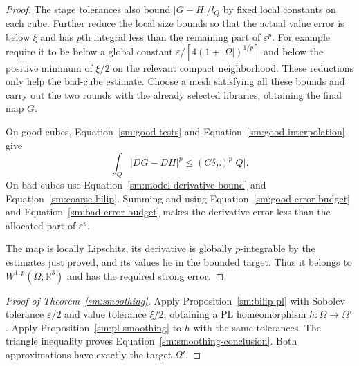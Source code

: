 \documentclass[11pt]{article}
\numberwithin{equation}{section}
\theoremstyle{definition}
\theoremstyle{remark}
\begin{document}
\begin{proof}
The stage tolerances also bound
$|G-H|/l_Q$ by fixed local constants
on each cube.  Further reduce the
local size bounds so that the actual
value error is below $\xi$ and has
$p$th integral less than the remaining
part of $\varepsilon^p$.  For example require
it to be below a global constant
$\varepsilon/[4(1+|\Omega|)^{1/p}]$ and below
the positive minimum of $\xi/2$ on
the relevant compact neighborhood.
These reductions only help the bad-cube
estimate.  Choose a mesh satisfying all these bounds and carry
out the two rounds with the already selected libraries, obtaining
the final map $G$.

On good cubes, Equation~\eqref{sm:good-tests} and
Equation~\eqref{sm:good-interpolation} give
\[
 \int_Q|DG-DH|^p\le(C\delta_P)^p|Q|.
\]
On bad cubes use
Equation~\eqref{sm:model-derivative-bound} and
Equation~\eqref{sm:coarse-bilip}.  Summing and
using Equation~\eqref{sm:good-error-budget} and
Equation~\eqref{sm:bad-error-budget} makes the
derivative error less than the allocated
part of $\varepsilon^p$.

The map is locally Lipschitz,
its derivative is globally $p$-integrable
by the estimates just proved, and its
values lie in the bounded target.
Thus it belongs to $W^{1,p}(\Omega;\mathbb R^3)$
and has the required strong error.
\end{proof}

\begin{proof}[Proof of Theorem~\ref{sm:smoothing}]
Apply Proposition~\ref{sm:bilip-pl} with
Sobolev tolerance $\varepsilon/2$ and value
tolerance $\xi/2$, obtaining a PL
homeomorphism $h:\Omega\to\Omega'$.
Apply Proposition~\ref{sm:pl-smoothing}
to $h$ with the same tolerances.
The triangle inequality proves
Equation~\eqref{sm:smoothing-conclusion}.
Both approximations have exactly the
target $\Omega'$.
\end{proof}

\begingroup



\endgroup
\end{document}

